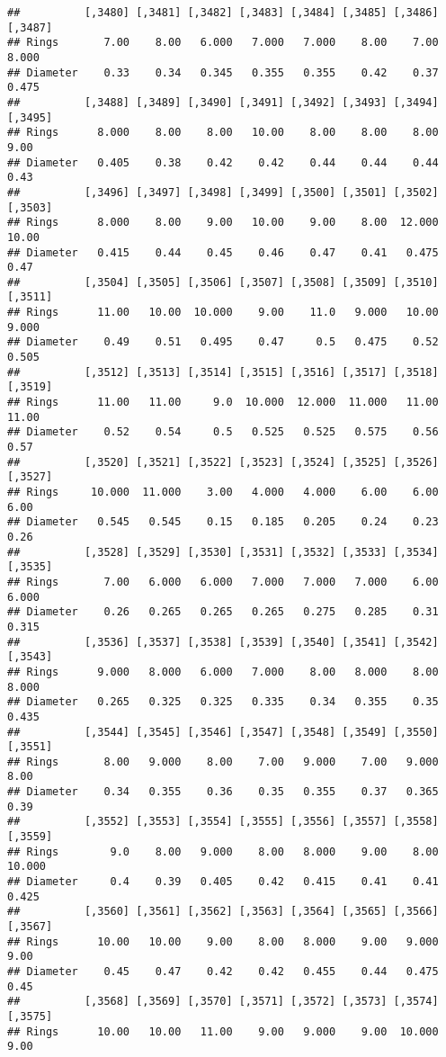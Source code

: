\documentclass[
]{article}
\begin{document}
\begin{verbatim}
##          [,3480] [,3481] [,3482] [,3483] [,3484] [,3485] [,3486] [,3487]
## Rings       7.00    8.00   6.000   7.000   7.000    8.00    7.00   8.000
## Diameter    0.33    0.34   0.345   0.355   0.355    0.42    0.37   0.475
##          [,3488] [,3489] [,3490] [,3491] [,3492] [,3493] [,3494] [,3495]
## Rings      8.000    8.00    8.00   10.00    8.00    8.00    8.00    9.00
## Diameter   0.405    0.38    0.42    0.42    0.44    0.44    0.44    0.43
##          [,3496] [,3497] [,3498] [,3499] [,3500] [,3501] [,3502] [,3503]
## Rings      8.000    8.00    9.00   10.00    9.00    8.00  12.000   10.00
## Diameter   0.415    0.44    0.45    0.46    0.47    0.41   0.475    0.47
##          [,3504] [,3505] [,3506] [,3507] [,3508] [,3509] [,3510] [,3511]
## Rings      11.00   10.00  10.000    9.00    11.0   9.000   10.00   9.000
## Diameter    0.49    0.51   0.495    0.47     0.5   0.475    0.52   0.505
##          [,3512] [,3513] [,3514] [,3515] [,3516] [,3517] [,3518] [,3519]
## Rings      11.00   11.00     9.0  10.000  12.000  11.000   11.00   11.00
## Diameter    0.52    0.54     0.5   0.525   0.525   0.575    0.56    0.57
##          [,3520] [,3521] [,3522] [,3523] [,3524] [,3525] [,3526] [,3527]
## Rings     10.000  11.000    3.00   4.000   4.000    6.00    6.00    6.00
## Diameter   0.545   0.545    0.15   0.185   0.205    0.24    0.23    0.26
##          [,3528] [,3529] [,3530] [,3531] [,3532] [,3533] [,3534] [,3535]
## Rings       7.00   6.000   6.000   7.000   7.000   7.000    6.00   6.000
## Diameter    0.26   0.265   0.265   0.265   0.275   0.285    0.31   0.315
##          [,3536] [,3537] [,3538] [,3539] [,3540] [,3541] [,3542] [,3543]
## Rings      9.000   8.000   6.000   7.000    8.00   8.000    8.00   8.000
## Diameter   0.265   0.325   0.325   0.335    0.34   0.355    0.35   0.435
##          [,3544] [,3545] [,3546] [,3547] [,3548] [,3549] [,3550] [,3551]
## Rings       8.00   9.000    8.00    7.00   9.000    7.00   9.000    8.00
## Diameter    0.34   0.355    0.36    0.35   0.355    0.37   0.365    0.39
##          [,3552] [,3553] [,3554] [,3555] [,3556] [,3557] [,3558] [,3559]
## Rings        9.0    8.00   9.000    8.00   8.000    9.00    8.00  10.000
## Diameter     0.4    0.39   0.405    0.42   0.415    0.41    0.41   0.425
##          [,3560] [,3561] [,3562] [,3563] [,3564] [,3565] [,3566] [,3567]
## Rings      10.00   10.00    9.00    8.00   8.000    9.00   9.000    9.00
## Diameter    0.45    0.47    0.42    0.42   0.455    0.44   0.475    0.45
##          [,3568] [,3569] [,3570] [,3571] [,3572] [,3573] [,3574] [,3575]
## Rings      10.00   10.00   11.00    9.00   9.000    9.00  10.000    9.00

\end{verbatim}
\end{document}
